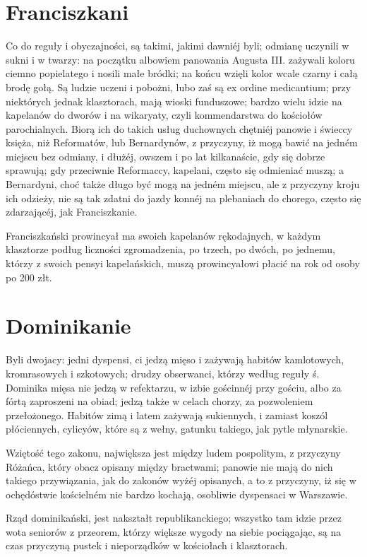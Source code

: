 \documentclass{book}
\begin{document}
\section{Franciszkani}

Co do reguły i obyczajności, są takimi, jakimi dawniéj byli; odmianę uczynili w sukni i w twarzy: na początku albowiem panowania Augusta III. zażywali koloru ciemno popielatego i nosili małe bródki; na końcu wzięli kolor wcale czarny i całą brodę gołą. Są ludzie uczeni i pobożni, lubo zaś są ex ordine medicantium; przy niektórych jednak klasztorach, mają wioski funduszowe; bardzo wielu idzie na kapelanów do dworów i na wikaryaty, czyli kommendarstwa do kościołów parochialnych. Biorą ich do takich usług duchownych chętniéj panowie i świeccy księża, niż Reformatów, lub Bernardynów, z przyczyny, iż mogą bawić na jedném miejscu bez odmiany, i dłużéj, owszem i po lat kilkanaście, gdy się dobrze sprawują; gdy przeciwnie Reformaccy, kapelani, często się odmieniać muszą; a Bernardyni, choć także długo być mogą na jedném miejscu, ale z przyczyny kroju ich odzieży, nie są tak zdatni do jazdy konnéj na plebaniach do chorego, często się zdarzającéj, jak Franciszkanie.

Franciszkański prowincyał ma swoich kapelanów rękodajnych, w każdym klasztorze podług liczności zgromadzenia, po trzech, po dwóch, po jednemu, którzy z swoich pensyi kapelańskich, muszą prowincyałowi płacić na rok od osoby po 200 złt.

\section{Dominikanie}

Byli dwojacy: jedni dyspensi, ci jedzą mięso i zażywają habitów kamlotowych, kromrasowych i szkotowych; drudzy obserwanci, którzy według reguły ś. Dominika mięsa nie jedzą w refektarzu, w izbie gościnnéj przy gościu, albo za fórtą zaproszeni na obiad; jedzą także w celach chorzy, za pozwoleniem przełożonego. Habitów zimą i latem zażywają sukiennych, i zamiast koszól płóciennych, cylicyów, które są z wełny, gatunku takiego, jak pytle młynarskie.

Wziętość tego zakonu, największa jest między ludem pospolitym, z przyczyny Różańca, który obacz opisany między bractwami; panowie nie mają do nich takiego przywiązania, jak do zakonów wyżéj opisanych, a to z przyczyny, iż się w ochędóstwie kościelném nie bardzo kochają, osobliwie dyspensaci w Warszawie.

Rząd dominikański, jest nakształt republikanckiego; wszystko tam idzie przez wota seniorów z przeorem, którzy większe wygody na siebie pociągając, są na czas przyczyną pustek i nieporządków w kościołach i klasztorach.
\end{document}
